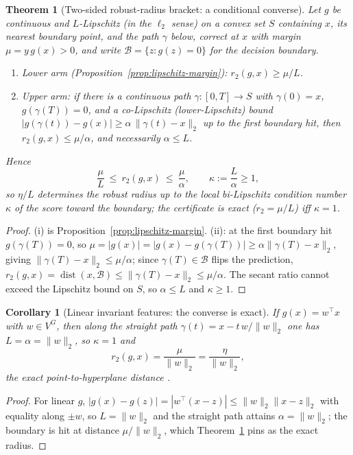 \documentclass[11pt]{article}
\theoremstyle{plain}
\newtheorem{theorem}{Theorem}
\newtheorem{corollary}{Corollary}
\theoremstyle{definition}
\theoremstyle{remark}
\begin{document}
\begin{theorem}[Two-sided robust-radius bracket: a conditional converse]\label{thm:sandwich}
Let $g$ be continuous and $L$-Lipschitz (in the $\ell_2$ sense) on a convex set $S$ containing $x$, its nearest boundary point, and the path $\gamma$ below, correct at $x$ with margin $\mu=y\,g(x)>0$, and write $\mathcal B=\{z:g(z)=0\}$ for the decision boundary.
\begin{enumerate}[leftmargin=1.7em,label=\textup{(\roman*)}]
\item \emph{Lower arm} (Proposition~\ref{prop:lipschitz-margin}): $r_2(g,x)\ge \mu/L$.
\item \emph{Upper arm}: if there is a continuous path $\gamma:[0,T]\to S$ with $\gamma(0)=x$, $g(\gamma(T))=0$, and a \emph{co-Lipschitz} (lower-Lipschitz) bound $|g(\gamma(t))-g(x)|\ge\alpha\,\|\gamma(t)-x\|_2$ up to the first boundary hit, then $r_2(g,x)\le \mu/\alpha$, and necessarily $\alpha\le L$.
\end{enumerate}
Hence
\[
\frac{\mu}{L}\ \le\ r_2(g,x)\ \le\ \frac{\mu}{\alpha},\qquad \kappa:=\frac{L}{\alpha}\ge1,
\]
so $\eta/L$ determines the robust radius up to the local bi-Lipschitz condition number $\kappa$ of the score toward the boundary; the certificate is exact ($r_2=\mu/L$) iff $\kappa=1$.
\end{theorem}
\begin{proof}
(i) is Proposition~\ref{prop:lipschitz-margin}.  (ii): at the first boundary hit $g(\gamma(T))=0$, so $\mu=|g(x)|=|g(x)-g(\gamma(T))|\ge\alpha\|\gamma(T)-x\|_2$, giving $\|\gamma(T)-x\|_2\le\mu/\alpha$; since $\gamma(T)\in\mathcal B$ flips the prediction, $r_2(g,x)=\operatorname{dist}(x,\mathcal B)\le\|\gamma(T)-x\|_2\le\mu/\alpha$.  The secant ratio cannot exceed the Lipschitz bound on $S$, so $\alpha\le L$ and $\kappa\ge1$.
\end{proof}

\begin{corollary}[Linear invariant features: the converse is exact]\label{cor:linear-exact}
If $g(x)=w^\top x$ with $w\in V^G$, then along the straight path $\gamma(t)=x-t\,w/\|w\|_2$ one has $L=\alpha=\|w\|_2$, so $\kappa=1$ and
\[
r_2(g,x)=\frac{\mu}{\|w\|_2}=\frac{\eta}{\|w\|_2},
\]
the exact point-to-hyperplane distance \citep{HeinAndriushchenko2017,CristianiniShaweTaylor2000}.
\end{corollary}
\begin{proof}
For linear $g$, $|g(x)-g(z)|=|w^\top(x-z)|\le\|w\|_2\|x-z\|_2$ with equality along $\pm w$, so $L=\|w\|_2$ and the straight path attains $\alpha=\|w\|_2$; the boundary is hit at distance $\mu/\|w\|_2$, which Theorem~\ref{thm:sandwich} pins as the exact radius.
\end{proof}
\end{document}
